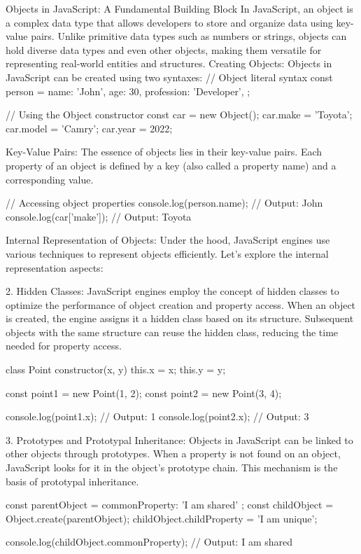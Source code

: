 Objects in JavaScript: A Fundamental Building Block
In JavaScript, an object is a complex data type that allows developers to store and organize data using key-value pairs. Unlike primitive data types such as numbers or strings, objects can hold diverse data types and even other objects, making them versatile for representing real-world entities and structures.
Creating Objects:
Objects in JavaScript can be created using two syntaxes:
// Object literal syntax
const person = {
  name: 'John',
  age: 30,
  profession: 'Developer',
};

// Using the Object constructor
const car = new Object();
car.make = 'Toyota';
car.model = 'Camry';
car.year = 2022;


Key-Value Pairs:
The essence of objects lies in their key-value pairs. Each property of an object is defined by a key (also called a property name) and a corresponding value.

// Accessing object properties
console.log(person.name); // Output: John
console.log(car['make']);  // Output: Toyota

Internal Representation of Objects:
Under the hood, JavaScript engines use various techniques to represent objects efficiently. Let's explore the internal representation aspects:

2. Hidden Classes:
JavaScript engines employ the concept of hidden classes to optimize the performance of object creation and property access. When an object is created, the engine assigns it a hidden class based on its structure. Subsequent objects with the same structure can reuse the hidden class, reducing the time needed for property access.

class Point {
  constructor(x, y) {
    this.x = x;
    this.y = y;
  }
}

const point1 = new Point(1, 2);
const point2 = new Point(3, 4);

console.log(point1.x); // Output: 1
console.log(point2.x); // Output: 3

3. Prototypes and Prototypal Inheritance:
Objects in JavaScript can be linked to other objects through prototypes. When a property is not found on an object, JavaScript looks for it in the object's prototype chain. This mechanism is the basis of prototypal inheritance.

const parentObject = { commonProperty: 'I am shared' };
const childObject = Object.create(parentObject);
childObject.childProperty = 'I am unique';

console.log(childObject.commonProperty); // Output: I am shared

